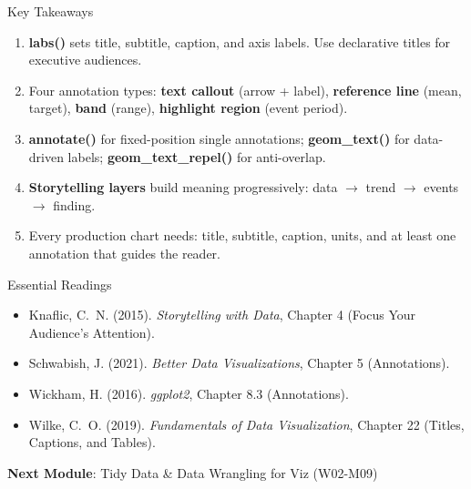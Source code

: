 \documentclass[10pt]{beamer}
\begin{document}
\begin{frame}{Key Takeaways}
  \begin{enumerate}
    \item \textbf{labs()} sets title, subtitle, caption, and axis labels.
          Use declarative titles for executive audiences.
    \item Four annotation types: \textbf{text callout} (arrow + label),
          \textbf{reference line} (mean, target), \textbf{band} (range),
          \textbf{highlight region} (event period).
    \item \textbf{annotate()} for fixed-position single annotations;
          \textbf{geom\_text()} for data-driven labels;
          \textbf{geom\_text\_repel()} for anti-overlap.
    \item \textbf{Storytelling layers} build meaning progressively:
          data $\rightarrow$ trend $\rightarrow$ events $\rightarrow$ finding.
    \item Every production chart needs: title, subtitle, caption, units,
          and at least one annotation that guides the reader.
  \end{enumerate}
\end{frame}

\begin{frame}{Essential Readings}
  \begin{itemize}
    \item Knaflic, C.~N. (2015). \emph{Storytelling with Data},
          Chapter 4 (Focus Your Audience's Attention).
    \item Schwabish, J. (2021). \emph{Better Data Visualizations},
          Chapter 5 (Annotations).
    \item Wickham, H. (2016). \emph{ggplot2}, Chapter 8.3 (Annotations).
    \item Wilke, C.~O. (2019). \emph{Fundamentals of Data Visualization},
          Chapter 22 (Titles, Captions, and Tables).
  \end{itemize}
  \vspace{6pt}
  \textbf{Next Module}: Tidy Data \& Data Wrangling for Viz (W02-M09)
\end{frame}
\end{document}
